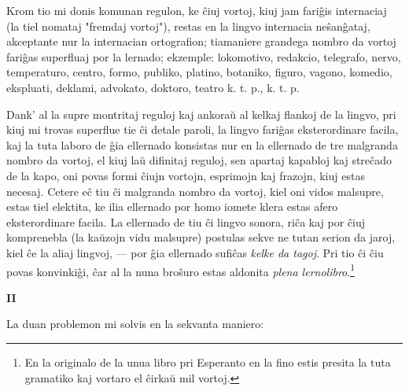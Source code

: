    Krom tio mi donis komunan regulon, ke \^ciuj vortoj, kiuj jam fari\^gis
internaciaj (la tiel nomataj "fremdaj vortoj"), restas en la
lingvo internacia ne\^san\^gataj, akceptante nur la internacian
ortografion; tiamaniere grandega nombro da vortoj fari\^gas
superfluaj por la lernado; ekzemple: lokomotivo, redakcio,
telegrafo, nervo, temperaturo, centro, formo, publiko, platino,
bo\-ta\-ni\-ko, figuro, vagono, komedio, ekspluati, deklami,
advokato, doktoro, teatro k. t. p., k. t. p.

   Dank' al la supre montritaj reguloj kaj ankora\u u al kelkaj flankoj de
la lingvo, pri kiuj mi trovas superflue tie \^ci detale paroli, la
lingvo fari\^gas eksterordinare facila, kaj la tuta laboro de \^gia
ellernado konsistas nur en la ellernado de tre malgranda nombro da
vortoj, el kiuj la\u u difinitaj reguloj, sen apartaj kapabloj kaj
stre\^cado de la kapo, oni povas formi \^ciujn vortojn, esprimojn
kaj frazojn, kiuj estas necesaj. Cetere e\^c tiu \^ci malgranda
nombro da vortoj, kiel oni vidos malsupre, estas tiel elektita, ke
ilia ellernado por homo iomete klera estas afero eksterordinare
facila. La ellernado de tiu \^ci lingvo sonora, ri\^ca kaj por
\^ciuj komprenebla (la ka\u uzojn vidu malsupre) postulas sekve ne
tutan serion da jaroj, kiel \^ce la aliaj lingvoj, --- por \^gia
ellernado sufi\^cas {\sl kelke da tagoj}. Pri tio \^ci \^ciu povas
konvinki\^gi, \^car al la nuna bro\^suro estas aldonita {\sl plena
lernolibro}.\footnote{En la originalo de la unua libro pri
Esperanto en la fino estis presita la tuta gramatiko kaj vortaro el
\^cirka\u u mil vortoj.}

\begin{center}
\textbf{II}
\end{center}

   La duan problemon mi solvis en la sekvanta maniero:

